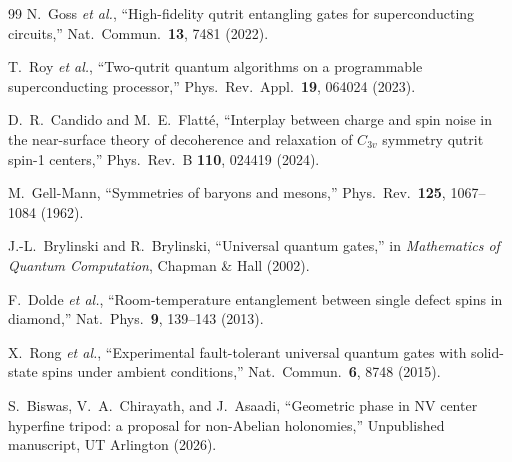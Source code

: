 \documentclass[11pt,letterpaper]{article}
\begin{document}
\begin{thebibliography}{99}
N.~Goss \textit{et al.},
``High-fidelity qutrit entangling gates for superconducting circuits,''
Nat.\ Commun.\ \textbf{13}, 7481 (2022).

T.~Roy \textit{et al.},
``Two-qutrit quantum algorithms on a programmable superconducting processor,''
Phys.\ Rev.\ Appl.\ \textbf{19}, 064024 (2023).

D.~R.~Candido and M.~E.~Flatt\'{e},
``Interplay between charge and spin noise in the near-surface theory of decoherence and relaxation of $C_{3v}$ symmetry qutrit spin-1 centers,''
Phys.\ Rev.\ B \textbf{110}, 024419 (2024).

M.~Gell-Mann,
``Symmetries of baryons and mesons,''
Phys.\ Rev.\ \textbf{125}, 1067--1084 (1962).

J.-L.~Brylinski and R.~Brylinski,
``Universal quantum gates,''
in \textit{Mathematics of Quantum Computation}, Chapman \& Hall (2002).

F.~Dolde \textit{et al.},
``Room-temperature entanglement between single defect spins in diamond,''
Nat.\ Phys.\ \textbf{9}, 139--143 (2013).

X.~Rong \textit{et al.},
``Experimental fault-tolerant universal quantum gates with solid-state spins under ambient conditions,''
Nat.\ Commun.\ \textbf{6}, 8748 (2015).

S.~Biswas, V.~A.~Chirayath, and J.~Asaadi,
``Geometric phase in {NV} center hyperfine tripod: a proposal for non-{Abelian} holonomies,''
Unpublished manuscript, UT Arlington (2026).

\end{thebibliography}
\end{document}
